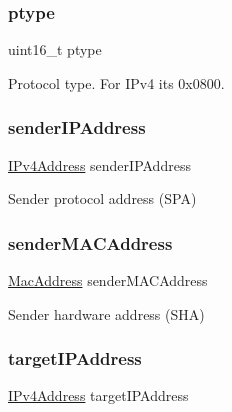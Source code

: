 \subsubsection{\texorpdfstring{ptype}{ptype}}
{\footnotesize\ttfamily uint16\+\_\+t ptype}



Protocol type. For I\+Pv4 it\textquotesingle{}s 0x0800. 

\mbox{\label{struct_a_r_pmessage__t_a327239df3565c3a31da48f74b65e15b1}} 
\subsubsection{\texorpdfstring{senderIPAddress}{senderIPAddress}}
{\footnotesize\ttfamily \mbox{\hyperlink{group__ipv4_gaea6452a06c6a1edb025bdd2a70fef14c}{I\+Pv4\+Address}} sender\+I\+P\+Address}



Sender protocol address (S\+PA) 

\mbox{\label{struct_a_r_pmessage__t_a373dc2ffcc6b2a5b9a8682478906c256}} 
\subsubsection{\texorpdfstring{senderMACAddress}{senderMACAddress}}
{\footnotesize\ttfamily \mbox{\hyperlink{ethernet_types_8h_ae4e06476597d217d540a5e2b2d699649}{Mac\+Address}} sender\+M\+A\+C\+Address}



Sender hardware address (S\+HA) 

\mbox{\label{struct_a_r_pmessage__t_a810f2c0c6e91e68940dbf87740664f0f}} 
\subsubsection{\texorpdfstring{targetIPAddress}{targetIPAddress}}
{\footnotesize\ttfamily \mbox{\hyperlink{group__ipv4_gaea6452a06c6a1edb025bdd2a70fef14c}{I\+Pv4\+Address}} target\+I\+P\+Address}



